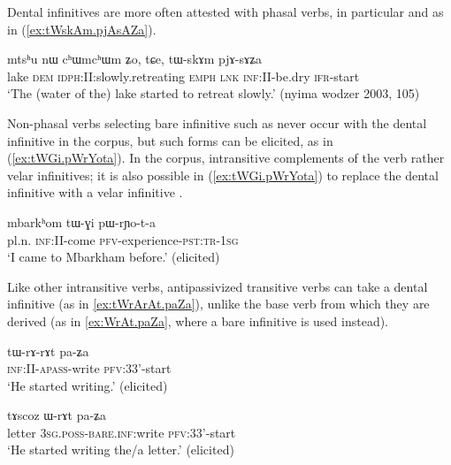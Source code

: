 Dental infinitives are more often attested with phasal verbs, in particular  and  as in (\ref{ex:tWskAm.pjAsAZa}).

\begin{exe}
\ex \label{ex:tWskAm.pjAsAZa}
\gll mtsʰu nɯ cʰɯmcʰɯm ʑo, tɕe, tɯ-skɤm pjɤ-sɤʑa \\
lake \textsc{dem} \textsc{idph}:II:slowly.retreating \textsc{emph} \textsc{lnk} \textsc{inf}:II-be.dry \textsc{ifr}-start \\
\glt `The (water of the) lake started to retreat slowly.' (nyima wodzer 2003, 105)
\end{exe}

Non-phasal verbs selecting bare infinitive such as  never occur with the dental infinitive in the corpus, but such forms can be elicited, as in (\ref{ex:tWGi.pWrYota}). In the corpus, intransitive complements of the verb  rather velar infinitives; it is also possible  in (\ref{ex:tWGi.pWrYota}) to replace the dental infinitive  with a velar infinitive .

\begin{exe}
\ex \label{ex:tWGi.pWrYota}
\gll  mbarkʰom tɯ-ɣi pɯ-rɲo-t-a  \\
pl.n. \textsc{inf}:II-come \textsc{pfv}-experience-\textsc{pst}:\textsc{tr}-\textsc{1sg} \\
\glt `I came to Mbarkham before.' (elicited)
\end{exe}

Like other intransitive verbs, antipassivized transitive verbs can take a dental infinitive (as in \ref{ex:tWrArAt.paZa}), unlike the base verb from which they are derived (as in \ref{ex:WrAt.paZa}, where a bare infinitive is used instead).

\begin{exe}
\ex \label{ex:tWrArAt.paZa}
\gll tɯ-rɤ-rɤt pa-ʑa \\
\textsc{inf}:II-\textsc{apass}-write \textsc{pfv}:3\fl{}3'-start \\
\glt `He started writing.' (elicited)
\end{exe}

\begin{exe}
\ex \label{ex:WrAt.paZa}
\gll tɤscoz ɯ-rɤt pa-ʑa \\
letter \textsc{3sg}.\textsc{poss}-\textsc{bare.inf:}write \textsc{pfv}:3\fl{}3'-start \\
\glt `He started writing the/a letter.' (elicited)
\end{exe}

